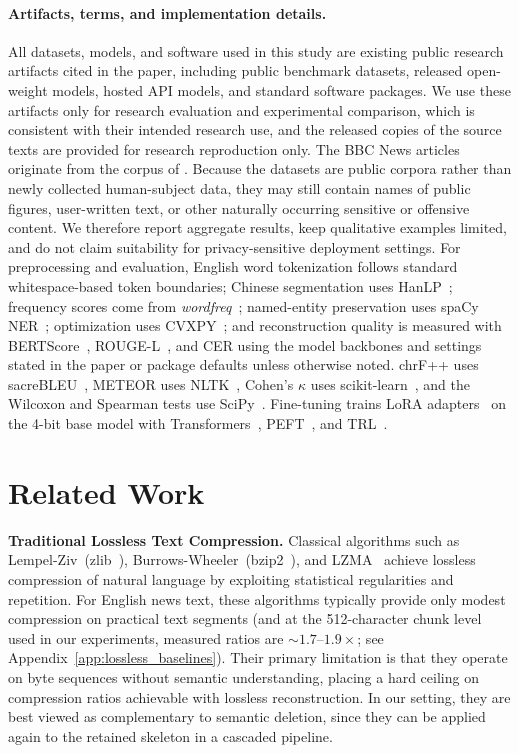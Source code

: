 \documentclass[11pt]{article}
\begin{document}
\paragraph{Artifacts, terms, and implementation details.}
All datasets, models, and software used in this study are existing public research artifacts cited in the paper, including public benchmark datasets, released open-weight models, hosted API models, and standard software packages. We use these artifacts only for research evaluation and experimental comparison, which is consistent with their intended research use, and the released copies of the source texts are provided for research reproduction only. The BBC News articles originate from the corpus of \citet{greene2006practical}. Because the datasets are public corpora rather than newly collected human-subject data, they may still contain names of public figures, user-written text, or other naturally occurring sensitive or offensive content. We therefore report aggregate results, keep qualitative examples limited, and do not claim suitability for privacy-sensitive deployment settings. For preprocessing and evaluation, English word tokenization follows standard whitespace-based token boundaries; Chinese segmentation uses HanLP~\citep{hanlp}; frequency scores come from \textit{wordfreq}~\citep{speer2022wordfreq}; named-entity preservation uses spaCy NER~\citep{honnibal2020spacy}; optimization uses CVXPY~\citep{diamond2016cvxpy}; and reconstruction quality is measured with BERTScore~\citep{zhang2020bertscore}, ROUGE-L~\citep{lin2004rouge}, and CER using the model backbones and settings stated in the paper or package defaults unless otherwise noted. chrF++ uses sacreBLEU~\citep{post2018call}, METEOR uses NLTK~\citep{bird2009natural}, Cohen's $\kappa$ uses scikit-learn~\citep{pedregosa2011scikit}, and the Wilcoxon and Spearman tests use SciPy~\citep{virtanen2020scipy}. Fine-tuning trains LoRA adapters~\citep{hu2022lora} on the 4-bit base model with Transformers~\citep{wolf2020transformers}, PEFT~\citep{mangrulkar2022peft}, and TRL~\citep{vonwerra2020trl}.

\section{Related Work}
\label{app:related_work}

\textbf{Traditional Lossless Text Compression.}
Classical algorithms such as Lempel-Ziv~(zlib~\citep{zlib}),
Burrows-Wheeler~(bzip2~\citep{bz2}), and
LZMA~\citep{lzma} achieve lossless compression of natural
language by exploiting statistical regularities and repetition.
For English news text, these algorithms typically
provide only modest compression on practical text segments (and
at the 512-character chunk level used in our experiments, measured
ratios are ${\sim}1.7$--$1.9\times$; see Appendix~\ref{app:lossless_baselines}). Their primary limitation
is that they operate on byte sequences without semantic
understanding, placing a hard ceiling on compression ratios
achievable with lossless reconstruction. In our setting, they are best viewed as complementary to semantic deletion, since they can be applied again to the retained skeleton in a cascaded pipeline.
\end{document}

